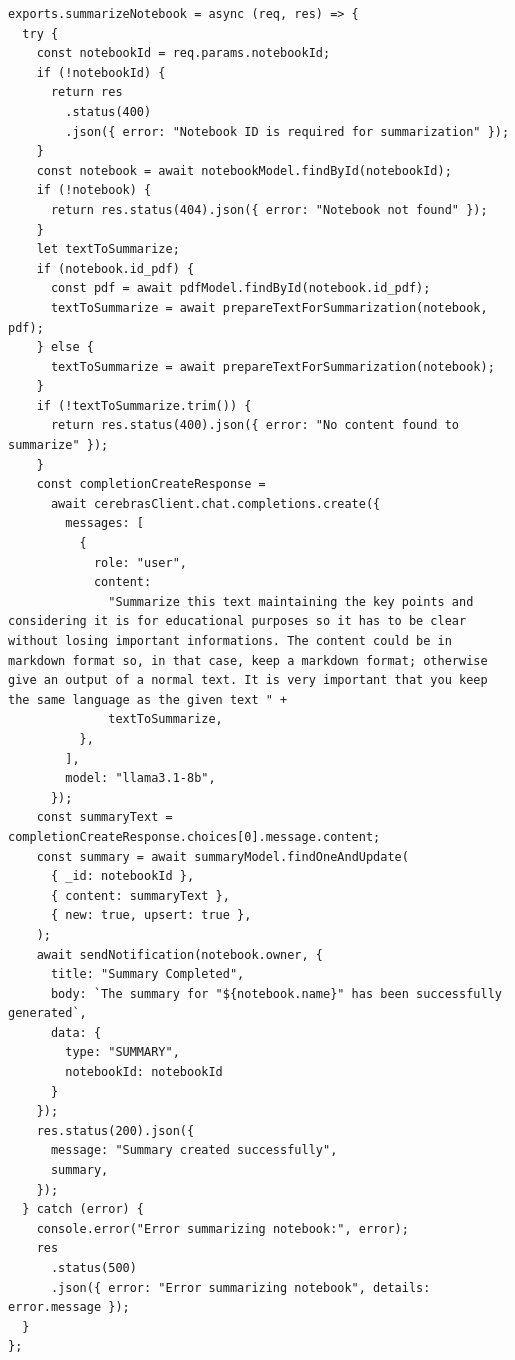 \begin{lstlisting}[style=javascript, caption=Funzione per riassumere le note di un notebook]
exports.summarizeNotebook = async (req, res) => {
  try {
    const notebookId = req.params.notebookId;
    if (!notebookId) {
      return res
        .status(400)
        .json({ error: "Notebook ID is required for summarization" });
    }
    const notebook = await notebookModel.findById(notebookId);
    if (!notebook) {
      return res.status(404).json({ error: "Notebook not found" });
    }
    let textToSummarize;
    if (notebook.id_pdf) {
      const pdf = await pdfModel.findById(notebook.id_pdf);
      textToSummarize = await prepareTextForSummarization(notebook, pdf);
    } else {
      textToSummarize = await prepareTextForSummarization(notebook);
    }
    if (!textToSummarize.trim()) {
      return res.status(400).json({ error: "No content found to summarize" });
    }
    const completionCreateResponse =
      await cerebrasClient.chat.completions.create({
        messages: [
          {
            role: "user",
            content:
              "Summarize this text maintaining the key points and considering it is for educational purposes so it has to be clear without losing important informations. The content could be in markdown format so, in that case, keep a markdown format; otherwise give an output of a normal text. It is very important that you keep the same language as the given text " +
              textToSummarize,
          },
        ],
        model: "llama3.1-8b",
      });
    const summaryText = completionCreateResponse.choices[0].message.content;
    const summary = await summaryModel.findOneAndUpdate(
      { _id: notebookId },
      { content: summaryText },
      { new: true, upsert: true },
    );
    await sendNotification(notebook.owner, {
      title: "Summary Completed",
      body: `The summary for "${notebook.name}" has been successfully generated`,
      data: {
        type: "SUMMARY",
        notebookId: notebookId
      }
    });
    res.status(200).json({
      message: "Summary created successfully",
      summary,
    });
  } catch (error) {
    console.error("Error summarizing notebook:", error);
    res
      .status(500)
      .json({ error: "Error summarizing notebook", details: error.message });
  }
};
\end{lstlisting}

